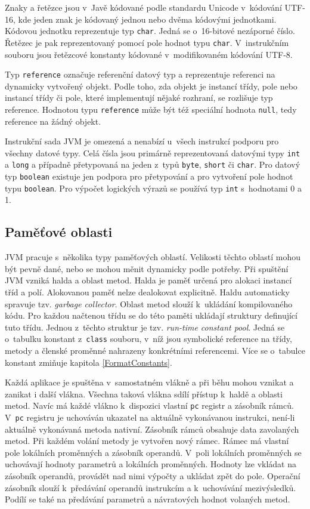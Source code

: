 Znaky a řetězce jsou v~Javě kódované podle standardu Unicode v~kódování UTF-16, kde jeden znak je kódovaný jednou nebo dvěma kódovými jednotkami. Kódovou jednotku reprezentuje typ \texttt{char}. Jedná se o~16-bitové nezáporné číslo. Řetězec je pak reprezentovaný pomocí pole hodnot typu \texttt{char}. V~instrukčním souboru jsou řetězcové konstanty kódované v~modifikovaném kódování UTF-8. 

Typ \texttt{reference} označuje referenční datový typ a reprezentuje referenci na dynamicky vytvořený objekt. Podle toho, zda objekt je instancí třídy, pole nebo instancí třídy či pole, které implementují nějaké rozhraní, se rozlišuje typ reference. Hodnotou typu \texttt{reference} může být též speciální hodnota \texttt{null}, tedy reference na žádný objekt. 



Instrukční sada JVM je omezená a nenabízí u~všech instrukcí podporu pro všechny datové typy. Celá čísla jsou primárně reprezentovaná datovými typy \texttt{int} a \texttt{long} a případně přetypovaná na jeden z~typů \texttt{byte}, \texttt{short} či \texttt{char}. Pro datový typ \texttt{boolean} existuje jen podpora pro přetypování a pro vytvoření pole hodnot typu \texttt{boolean}. Pro výpočet logických výrazů se používá typ \texttt{int} s~hodnotami 0 a 1.


\subsection{Paměťové oblasti}\label{JVMData}

JVM pracuje s~několika typy paměťových oblastí. Velikosti těchto oblastí mohou být pevně dané, nebo se mohou měnit dynamicky podle potřeby. Při spuštění JVM vzniká halda a oblast metod. Halda je paměť určená pro alokaci instancí tříd a polí. Alokovanou paměť nelze dealokovat explicitně. Haldu automaticky spravuje tzv. \textit{garbage collector}. Oblast metod slouží k~ukládání kompilovaného kódu. Pro každou načtenou třídu se do této paměti ukládají struktury definující tuto třídu. Jednou z~těchto struktur je tzv. \textit{run-time constant pool}. Jedná se o~tabulku konstant z~\texttt{class} souboru, v~níž jsou symbolické reference na třídy, metody a členské proměnné nahrazeny konkrétními referencemi. Více se o~tabulce konstant zmiňuje kapitola \ref{FormatConstants}.

Každá aplikace je spuštěna v~samostatném vlákně a při běhu mohou vznikat a zanikat i další vlákna. Všechna taková vlákna sdílí přístup k~haldě a oblasti metod. Navíc má každé vlákno k~dispozici vlastní \texttt{pc} registr a zásobník rámců. V~\texttt{pc} registru je uchováván ukazatel na aktuálně vykonávanou instrukci, není-li aktuálně vykonávaná metoda nativní. Zásobník rámců obsahuje data zavolaných metod. Při každém volání metody je vytvořen nový rámec. Rámec má vlastní pole lokálních proměnných a zásobník operandů. V~poli lokálních proměnných se uchovávají hodnoty parametrů a lokálních proměnných. Hodnoty lze vkládat na zásobník operandů, provádět nad nimi výpočty a ukládat zpět do pole. Operační zásobník slouží k~předávání operandů instrukcím a k~uchovávání mezivýsledků. Podílí se také na předávání parametrů a návratových hodnot volaných metod.

